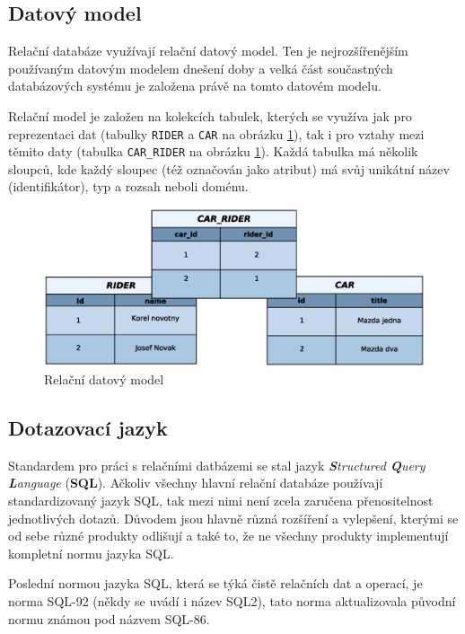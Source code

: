 \subsection{Datový model}
Relační databáze využívají relační datový model. Ten je nejrozšířenějším používaným datovým modelem dnešení doby a velká část součastných databázových systému je založena právě na tomto datovém modelu.

Relační model je založen na kolekcích tabulek, kterých se využíva jak pro reprezentaci dat (tabulky \texttt{RIDER} a \texttt{CAR} na obrázku \ref{fig:rel_model}), tak i pro vztahy mezi těmito daty (tabulka \texttt{CAR\_RIDER} na obrázku \ref{fig:rel_model}). Každá tabulka má několik sloupců, kde každý sloupec (též označován jako atribut) má svůj unikátní název (identifikátor), typ a rozsah neboli doménu.
\begin{figure}[h]
  \begin{center}
    \includegraphics[width=40em]{obr/rel_model}
    \caption{Relační datový model}
    \label{fig:rel_model}
  \end{center}
\end{figure}
\subsection{Dotazovací jazyk}
Standardem pro práci s relačními datbázemi se stal jazyk \emph{\textbf{S}tructured \textbf{Q}uery \textbf{L}anguage} (\textbf{SQL}). Ačkoliv všechny hlavní relační databáze používají standardizovaný jazyk SQL, tak mezi nimi není zcela zaručena přenositelnost jednotlivých dotazů. Důvodem jsou hlavně různá rozšíření a vylepšení, kterými se od sebe různé produkty odlišují a také to, že ne všechny produkty implementují kompletní normu jazyka SQL.

Poslední normou jazyka SQL, která se týká čistě relačních dat a operací, je norma SQL-92 (někdy se uvádí i název SQL2), tato norma aktualizovala původní normu známou pod názvem SQL-86.
